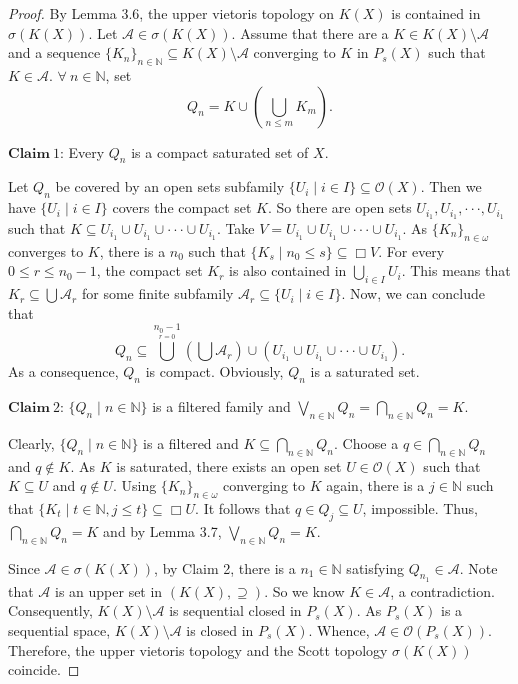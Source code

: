 \documentclass[preprint,12pt]{elsarticle}
\numberwithin{equation}{section}
\begin{document}
\begin{proof} By Lemma 3.6, the upper vietoris topology on $K(X)$ is contained in $\sigma(K(X))$. Let $\mathcal{A}\in\sigma(K(X))$. Assume that there are a $K\in K(X)\setminus\mathcal{A}$ and a sequence $\{K_{n}\}_{n\in\mathbb{N}}\subseteq K(X)\setminus\mathcal{A}$ converging to $K$ in $P_{s}(X)$ such that $K\in\mathcal{A}$. $\forall\ n\in\mathbb{N}$, set $$Q_{n}=K\cup(\bigcup\limits_{n\leq m}K_{m}).$$

$\mathbf{Claim} \ 1$:  Every $Q_{n}$ is a compact saturated set of $X$.

Let $Q_{n}$ be covered by an open sets subfamily $\{U_{i}\mid i\in I\}\subseteq\mathcal{O}(X)$. Then we have $\{U_{i}\mid i\in I\}$ covers the compact set $K$. So there are open sets $U_{i_{1}},U_{i_{1}},\cdot\cdot\cdot,U_{i_{1}}$ such that $K\subseteq U_{i_{1}}\cup U_{i_{1}}\cup\cdot\cdot\cdot\cup U_{i_{1}}$. Take $V=U_{i_{1}}\cup U_{i_{1}}\cup\cdot\cdot\cdot\cup U_{i_{1}}$. As $\{K_{n}\}_{n\in\omega}$ converges to $K$, there is a $n_{0}$ such that $\{K_{s}\mid n_{0}\leq s\}\subseteq\Box V$. For every $0\leq r\leq n_{0}-1$, the compact set $K_{r}$ is also contained in $\bigcup\limits_{i\in I}U_{i}$. This means that $K_{r}\subseteq \bigcup\mathcal{A}_{r}$ for some finite subfamily $\mathcal{A}_{r}\subseteq\{U_{i}\mid i\in I\}$. Now, we can conclude that $$Q_{n}\subseteq \bigcup\limits^{n_{0}-1}\limits_{r=0}(\bigcup\mathcal{A}_{r})\cup(U_{i_{1}}\cup U_{i_{1}}\cup\cdot\cdot\cdot\cup U_{i_{1}}).$$ As a consequence, $Q_{n}$ is compact. Obviously, $Q_{n}$ is a saturated set.

$\mathbf{Claim} \ 2$: $\{Q_{n}\mid n\in\mathbb{N}\}$ is a filtered family and $\bigvee\limits_{n\in\mathbb{N}}Q_{n}=\bigcap\limits_{n\in\mathbb{N}}Q_{n}=K$.

Clearly, $\{Q_{n}\mid n\in\mathbb{N}\}$ is a filtered and $K\subseteq\bigcap\limits_{n\in\mathbb{N}}Q_{n}$. Choose a $q\in\bigcap\limits_{n\in\mathbb{N}}Q_{n}$ and $q\not\in K$. As $K$ is saturated, there exists an open set $U\in\mathcal{O}(X)$ such that $K\subseteq U$ and $q\not\in U$. Using $\{K_{n}\}_{n\in\omega}$ converging to $K$ again, there is a $j\in\mathbb{N}$ such that $\{K_{t}\mid t\in\mathbb{N},j\leq t\}\subseteq\Box U$. It follows that $q\in Q_{j}\subseteq U$, impossible. Thus, $\bigcap\limits_{n\in\mathbb{N}}Q_{n}=K$ and by Lemma 3.7, $\bigvee\limits_{n\in\mathbb{N}}Q_{n}=K$.

Since $\mathcal{A}\in\sigma(K(X))$, by Claim 2, there is a $n_{1}\in\mathbb{N}$ satisfying $Q_{n_{1}}\in\mathcal{A}$. Note that $\mathcal{A}$ is an upper set in $(K(X),\supseteq)$. So we know $K\in\mathcal{A}$, a contradiction. Consequently, $K(X)\setminus\mathcal{A}$ is sequential closed in $P_{s}(X)$. As $P_{s}(X)$ is a sequential space, $K(X)\setminus\mathcal{A}$ is closed in $P_{s}(X)$. Whence, $\mathcal{A}\in\mathcal{O}(P_{s}(X))$. Therefore, the upper vietoris topology and the Scott topology $\sigma(K(X))$ coincide. \end{proof}
\end{document}
